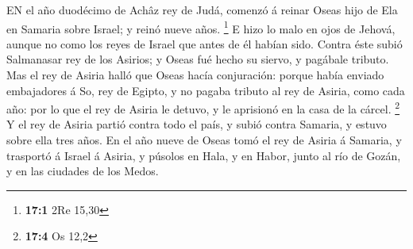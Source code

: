  EN el año duodécimo de Achâz rey de Judá, comenzó á reinar
Oseas hijo de Ela en Samaria sobre Israel; y reinó nueve años.
\footnote{\textbf{17:1} 2Re 15,30}  E hizo lo malo en ojos
de Jehová, aunque no como los reyes de Israel que antes de él habían
sido.  Contra éste subió Salmanasar rey de los Asirios; y
Oseas fué hecho su siervo, y pagábale tributo.  Mas el rey
de Asiria halló que Oseas hacía conjuración: porque había enviado
embajadores á So, rey de Egipto, y no pagaba tributo al rey de Asiria,
como cada año: por lo que el rey de Asiria le detuvo, y le aprisionó en
la casa de la cárcel. \footnote{\textbf{17:4} Os 12,2}  Y el
rey de Asiria partió contra todo el país, y subió contra Samaria, y
estuvo sobre ella tres años.  En el año nueve de Oseas tomó
el rey de Asiria á Samaria, y trasportó á Israel á Asiria, y púsolos en
Hala, y en Habor, junto al río de Gozán, y en las ciudades de los Medos.

